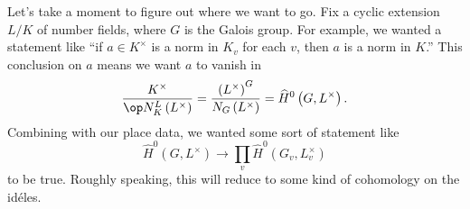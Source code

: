 \documentclass[../notes.tex]{subfiles}
\begin{document}
\begin{remark}
	Let's take a moment to figure out where we want to go. Fix a cyclic extension $L/K$ of number fields, where $G$ is the Galois group. For example, we wanted a statement like ``if $a\in K^\times$ is a norm in $K_v$ for each $v$, then $a$ is a norm in $K$.'' This conclusion on $a$ means we want $a$ to vanish in
	\[\frac{K^\times}{\op N^L_K\left(L^\times\right)}=\frac{\left(L^\times\right)^G}{N_G\left(L^\times\right)}=\widehat H^0\left(G,L^\times\right).\]
	Combining with our place data, we wanted some sort of statement like
	\[\widehat H^0\left(G,L^\times\right)\to\prod_v\widehat H^0\left(G_v,L_v^\times\right)\]
	to be true. Roughly speaking, this will reduce to some kind of cohomology on the id\'eles.
\end{remark}
\end{document}
